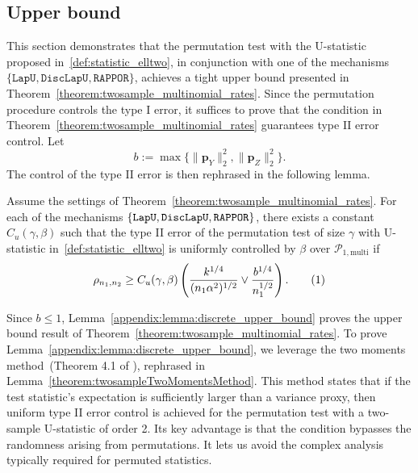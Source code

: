 \documentclass[twoside,11pt]{article}
\newcommand\numberthis{\addtocounter{equation}{1}\tag{\theequation}}
\newcommand{\rvTwo}{Y}
\newcommand{\rvThree}{Z}
\newcommand{\normSqMultinomMax}{b}
\newcommand{\alphabetSize}{k} %
\newcommand{\sampleSize}{n}
\newcommand{\probVec}{\mathbf{p}} %
\newcommand{\privacyParameter}{\alpha} %
\newcommand{\maxErrorTypeTwo}{\beta} %
\newcommand{\maxErrorTypeOne}{\gamma} %
\newcommand{\separation}{\rho} %
\begin{document}
\begin{appendix}
	\subsection{Upper bound} \label{sec: upper bound}
	This section demonstrates that the permutation test with the U-statistic proposed in~\eqref{def:statistic_elltwo}, in conjunction with one of the mechanisms $\{\texttt{LapU}, \texttt{DiscLapU}, \texttt{RAPPOR}\}$, achieves a tight upper bound presented in Theorem~\ref{theorem:twosample_multinomial_rates}.
	Since the permutation procedure controls the type I error, it suffices to prove that the condition in Theorem~\ref{theorem:twosample_multinomial_rates} guarantees type II error control.
	Let 
	\begin{equation}\label{definition:maximum_norm_squared}
		\normSqMultinomMax
		:=
		\max \{
		\|\probVec_{\rvTwo}\|_2^2,
		\|\probVec_{\rvThree}\|_2^2
		\}.
	\end{equation}
	The control of the type II error  is then rephrased in the following lemma.
	\begin{lemma}\label{appendix:lemma:discrete_upper_bound}
		Assume the settings of Theorem~\ref{theorem:twosample_multinomial_rates}.
		For each of the mechanisms $\{\textnormal{\texttt{LapU}}, \textnormal{\texttt{DiscLapU}}, \textnormal{\texttt{RAPPOR}}\}$, there exists a constant $C_u(\gamma, \beta)$ such that the type II error of the permutation test of size $\maxErrorTypeOne$ with U-statistic in~\eqref{def:statistic_elltwo} is uniformly controlled by $\maxErrorTypeTwo$ over $\mathcal{P}_{1,\mathrm{multi}}$ if
		\begin{align*}
			\separation_{\sampleSize_1, \sampleSize_2}
			\geq
			C_u(\gamma, \beta)
			\left(
			\frac
			{\alphabetSize^{1/4}}
			{(\sampleSize_1 \privacyParameter^2)^{1/2}}
			\vee
			\frac
			{{b}^{1/4}}
			{\sampleSize_1^{1/2}}
			\right).
			\numberthis \label{eq:two_moments_two_sample_cond_merge}
		\end{align*}
	\end{lemma} 
	Since ${b} \leq 1$, Lemma~\ref{appendix:lemma:discrete_upper_bound} proves the upper bound result of Theorem~\ref{theorem:twosample_multinomial_rates}. To prove Lemma~\ref{appendix:lemma:discrete_upper_bound}, we leverage the two moments method~(Theorem 4.1 of \citet{kim_minimax_2022}), rephrased in Lemma~\ref{theorem:twosampleTwoMomentsMethod}.
	This method states that if the test statistic’s expectation is sufficiently larger than a variance proxy, then uniform type II error control is achieved for the permutation test with a two-sample U-statistic of order 2.
	Its  key advantage is that the condition  bypasses the randomness arising from permutations. It lets us avoid the complex analysis typically required for permuted statistics.
	

\end{appendix}
\end{document}
